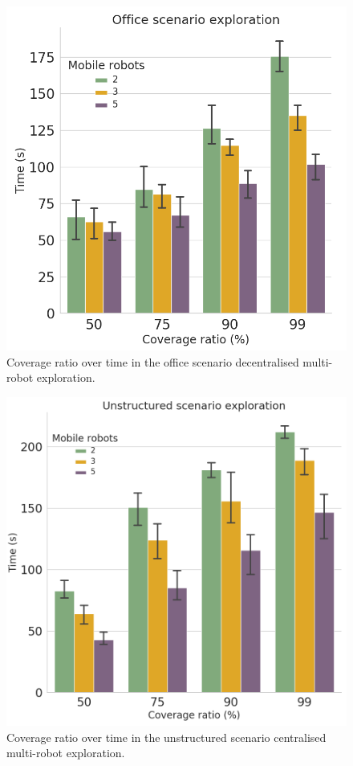 \documentclass[letterpaper, 10 pt, conference]{ieeeconf}  %
\begin{document}
\begin{figure}[h!]
	\centering\includegraphics[width=0.7\columnwidth]{office_coverage_decent.png}
	\caption{Coverage ratio over time in the office scenario decentralised multi-robot exploration.}
	\label{fig:office_decent}
\end{figure}

\begin{figure}[h!]
	\centering\includegraphics[width=0.7\columnwidth]{unstructured_coverage_cent.png}
	\caption{Coverage ratio over time in the unstructured scenario centralised multi-robot exploration.}
	\label{fig:unstruc_cent}
\end{figure}
\end{document}
